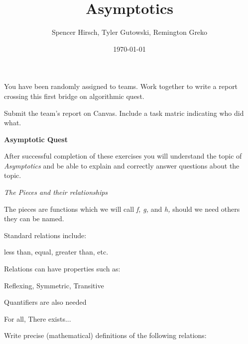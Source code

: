 \documentclass{article}
\begin{document}
\title{Asymptotics}
\author{Spencer Hirsch, Tyler Gutowski, Remington Greko}
\date{\today}
\maketitle

\noindent You have been randomly assigned to teams. Work together to write a report
crossing this first bridge on algorithmic quest.

\medskip

\noindent Submit the team's report on Canvas. Include a task matric indicating who 
did what.

\begin{table}

\end{table}

\bigskip

\noindent \textbf{Asymptotic Quest}

\medskip

After successful completion of these exercises you will understand the topic of
\textit{Asymptotics} and be able to explain and correctly answer questions about
the topic.

\bigskip

\noindent  \textit{The Pieces and their relationships}

\medskip

The pieces are functions which we will call \textit{f, g,} and \textit{h,} should
we need others they can be named.

\medskip

\noindent Standard relations include:

\medskip

\begin{center}
    less than, equal, greater than, etc.
\end{center}

\noindent Relations can have properties such as:

\begin{center}
Reflexing, Symmetric, Transitive
\end{center}

\noindent Quantifiers are also needed

\begin{center}
For all, There exists...
\end{center}

\noindent Write precise (mathematical) definitions of the following relations:
\end{document}
